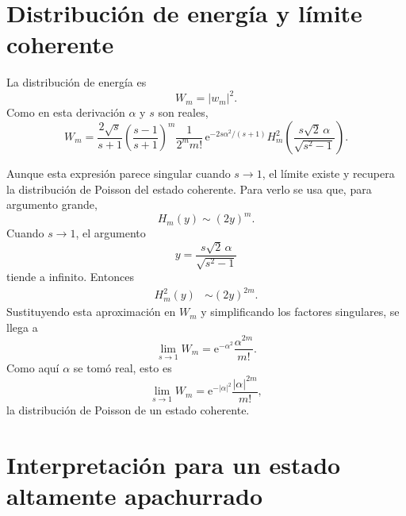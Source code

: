 \documentclass[11pt]{article}
\newcommand{\ee}{\mathrm{e}}
\begin{document}
\section{Distribuci\'on de energ\'ia y l\'imite coherente}

La distribuci\'on de energ\'ia es
\begin{equation}
  W_m=|w_m|^2.
\end{equation}
Como en esta derivaci\'on $\alpha$ y $s$ son reales,
\begin{equation}
  \boxed{
  W_m
  =
  \frac{2\sqrt{s}}{s+1}
  \left(\frac{s-1}{s+1}\right)^m
  \frac{1}{2^m m!}\,
  \ee^{-2s\alpha^2/(s+1)}
  H_m^2\left(
  \frac{s\sqrt2\,\alpha}{\sqrt{s^2-1}}
  \right).
  }
\end{equation}

Aunque esta expresi\'on parece singular cuando $s\to1$, el l\'imite existe y
recupera la distribuci\'on de Poisson del estado coherente. Para verlo se usa
que, para argumento grande,
\begin{equation}
  H_m(y)\sim (2y)^m.
\end{equation}
Cuando $s\to1$, el argumento
\begin{equation}
  y=\frac{s\sqrt2\,\alpha}{\sqrt{s^2-1}}
\end{equation}
tiende a infinito. Entonces
\begin{align}
  H_m^2(y)
  &\sim
  (2y)^{2m}.
\end{align}
Sustituyendo esta aproximaci\'on en $W_m$ y simplificando los factores
singulares, se llega a
\begin{equation}
  \lim_{s\to1}W_m
  =
  \ee^{-\alpha^2}\frac{\alpha^{2m}}{m!}.
\end{equation}
Como aqu\'i $\alpha$ se tom\'o real, esto es
\begin{equation}
  \boxed{
  \lim_{s\to1}W_m
  =
  \ee^{-|\alpha|^2}\frac{|\alpha|^{2m}}{m!},
  }
\end{equation}
la distribuci\'on de Poisson de un estado coherente.

\section{Interpretaci\'on para un estado altamente apachurrado}
\end{document}
